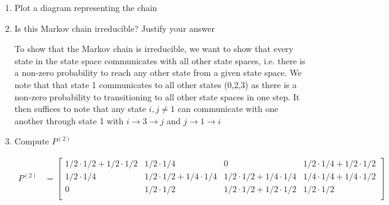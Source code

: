\documentclass[12pt,twoside, letter]{exam}
\theoremstyle{definition}
\begin{document}
\begin{enumerate}
  \item Plot a diagram representing the chain
    \begin{solution}
    \end{solution}
  \item Is this Markov chain irreducible? Justify your answer
    \begin{solution}
      To show that the Markov chain is irreducible, we want to show that every state in the state space communicates with all other state spaces, i.e.
      there is a non-zero probability to reach any other state from a given state space. We note that that state 1 communicates to all other states
      (0,2,3) as there
      is a non-zero probability to transitioning to all other state spaces in one step. It then suffices to note that any state $i,j \neq 1$ can communicate
      with one another through state 1 with $i \rightarrow 3 \rightarrow j$ and $j \rightarrow 1 \rightarrow i$
    \end{solution}
  \item Compute $P^{(2)}$
    \begin{solution}
    \begin{align*}
        P^{(2)} &=
          \begin{bmatrix}
            1/2\cdot1/2+1/2\cdot1/2 & 1/2\cdot1/4 & 0 & 1/2\cdot1/4+1/2\cdot1/2 \\
            1/2\cdot1/4&1/2\cdot1/2+1/4\cdot1/4 & 1/2\cdot1/2+1/4\cdot1/4 & 1/4\cdot1/4 +1/4\cdot1/2 \\
            0 & 1/2\cdot1/2 & 1/2\cdot1/2 + 1/2\cdot1/2 & 1/2\cdot1/2 \\

\end{bmatrix}
\end{align*}
\end{solution}
\end{enumerate}
\end{document}
